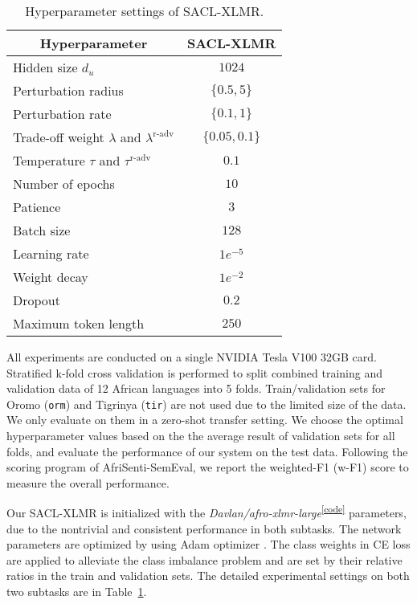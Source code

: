 \documentclass[11pt]{article}
\begin{document}
\begin{table}[t]
\centering
\begin{tabular}{l|c}
\hline 
\multicolumn{1}{c|}{Hyperparameter}    &  SACL-XLMR  \\ \hline
Hidden size \textbf{$d_u$} & $1024$ \\ 
Perturbation radius   &  $\{0.5, 5\}$ \\  
Perturbation rate  & $\{0.1, 1\}$  \\
Trade-off weight $\lambda$ and $\lambda^{\text{r-adv}}$  & $\{0.05, 0.1\}$ \\ 
Temperature $\tau$ and $\tau^{\text{r-adv}}$  & $0.1$ \\ \hline 
Number of epochs & $10$ \\
Patience & $3$ \\ 
Batch size & $128$ \\
Learning rate   & $1e^{-5}$  \\ 
Weight decay & $1e^{-2}$  \\ 
Dropout & $0.2$ \\
Maximum token length & $250$ \\
\hline
\end{tabular}
\caption{Hyperparameter settings of SACL-XLMR.}
\label{tab:param}
\end{table}

All experiments are conducted on a single NVIDIA Tesla V100 32GB card. 
Stratified k-fold cross validation  \citep{DBLP:conf/ijcai/Kohavi95} is performed to split combined training and validation data of 12 African languages into 5 folds. Train/validation sets for Oromo (\texttt{orm}) and Tigrinya (\texttt{tir}) are not used due to the limited size of the data. We only evaluate on them in a zero-shot transfer setting.
We choose the optimal hyperparameter values based on the the average result of validation sets for all folds, and evaluate the performance of our system on the test data.
Following the scoring program of AfriSenti-SemEval, we report the weighted-F1 (w-F1) score to measure the overall performance.

Our SACL-XLMR is initialized with the \textit{Davlan/afro-xlmr-large}\textsuperscript{\ref{code}} parameters, due to the nontrivial and consistent performance in both subtasks.
The network parameters are optimized by using Adam optimizer \citep{DBLP:journals/corr/KingmaB14}.
The class weights in CE loss are applied to alleviate the class imbalance problem 
and are set by their relative ratios in the train and validation sets.
The detailed experimental settings on both two subtasks are in Table~\ref{tab:param}.
\end{document}
